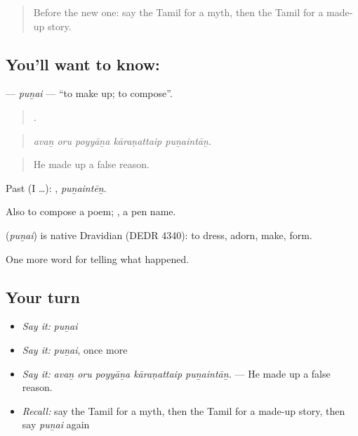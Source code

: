 \label{lesson:TA-C343-punai}



\begin{quote}
Before the new one: say the Tamil for a myth, then the Tamil for a made-up story.
\end{quote}

\subsection*{You'll want to know: }
\textbf{} — \emph{puṉai} — \textquotedblleft{}to make up; to compose\textquotedblright{}.

\begin{quote}
    .
\end{quote}

\begin{quote}
\emph{avaṉ oru poyyāṉa kāraṇattaip puṉaintāṉ.}
\end{quote}

\begin{quote}
He made up a false reason.
\end{quote}

Past (I …): , \emph{puṉaintēṉ}.

Also to compose a poem; , a pen name.

\begin{cousinweb}
\textbf{} (\emph{puṉai}) is native Dravidian (DEDR 4340): to dress, adorn, make, form.
\end{cousinweb}

\begin{grammarlens}[title={What you've built}]
One more word for telling what happened.
\end{grammarlens}

\subsection*{Your turn}
\begin{itemize}
\raggedright
  \item \emph{Say it:} \emph{puṉai}
  \item \emph{Say it:} \emph{puṉai}, once more
  \item \emph{Say it:} \emph{avaṉ oru poyyāṉa kāraṇattaip puṉaintāṉ.} — He made up a false reason.
  \item \emph{Recall:} say the Tamil for a myth, then the Tamil for a made-up story, then say \emph{puṉai} again
\end{itemize}

